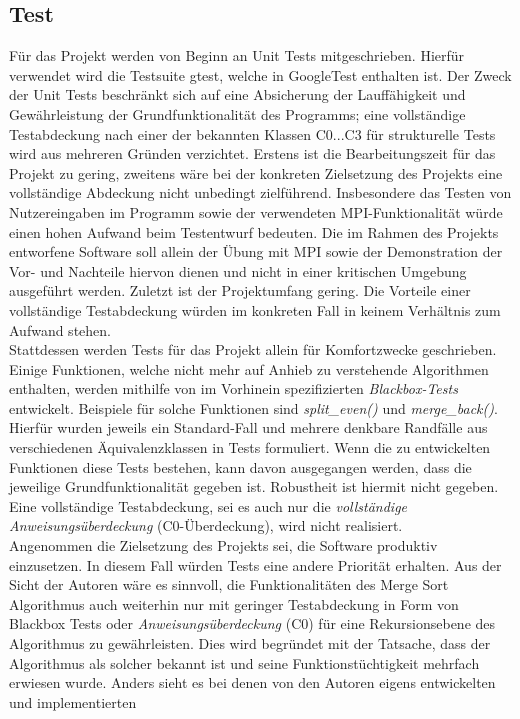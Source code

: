 \subsection{Test}
Für das Projekt werden von Beginn an Unit Tests mitgeschrieben. Hierfür verwendet wird die Testsuite gtest, welche in GoogleTest enthalten ist. Der Zweck der Unit Tests beschränkt sich auf eine Absicherung der Lauffähigkeit und Gewährleistung der Grundfunktionalität des Programms; eine vollständige Testabdeckung nach einer der bekannten Klassen C0...C3 für strukturelle Tests wird aus mehreren Gründen verzichtet. Erstens ist die Bearbeitungszeit für das Projekt zu gering, zweitens wäre bei der konkreten Zielsetzung des Projekts eine vollständige Abdeckung nicht unbedingt zielführend. Insbesondere das Testen von Nutzereingaben im Programm sowie der verwendeten MPI-Funktionalität würde einen hohen Aufwand beim Testentwurf bedeuten. Die im Rahmen des Projekts entworfene Software soll allein der Übung mit MPI sowie der Demonstration der Vor- und Nachteile hiervon dienen und nicht in einer kritischen Umgebung ausgeführt werden. Zuletzt ist der Projektumfang gering. Die Vorteile einer vollständige Testabdeckung würden im konkreten Fall in keinem Verhältnis zum Aufwand stehen.
\\
Stattdessen werden Tests für das Projekt allein für \glqq Komfortzwecke\grqq{} geschrieben. Einige Funktionen, welche nicht mehr auf Anhieb zu verstehende Algorithmen
enthalten, werden mithilfe von im Vorhinein spezifizierten \textit{Blackbox-Tests} entwickelt. Beispiele für solche Funktionen sind \textit{split\_even()} und \textit{merge\_back()}. Hierfür wurden jeweils ein Standard-Fall und mehrere denkbare Randfälle aus verschiedenen Äquivalenzklassen in Tests formuliert. 
Wenn die zu entwickelten Funktionen diese Tests bestehen, kann davon ausgegangen werden, dass die jeweilige Grundfunktionalität gegeben ist. Robustheit ist hiermit nicht gegeben. Eine vollständige Testabdeckung,
sei es auch \glqq nur\grqq{} die \textit{vollständige Anweisungsüberdeckung} (C0-Überdeckung), wird nicht realisiert.
\\
Angenommen die Zielsetzung des Projekts sei, die Software produktiv einzusetzen. In diesem Fall würden Tests eine andere Priorität erhalten. Aus der Sicht der Autoren wäre es sinnvoll, die Funktionalitäten des Merge Sort Algorithmus auch weiterhin nur mit geringer Testabdeckung in Form von Blackbox Tests oder \textit{Anweisungsüberdeckung} (C0) für eine Rekursionsebene des Algorithmus zu gewährleisten. 
Dies wird begründet mit der Tatsache, dass der Algorithmus als solcher bekannt ist und seine Funktionstüchtigkeit mehrfach erwiesen wurde. Anders sieht es bei denen von den Autoren eigens entwickelten und implementierten 
